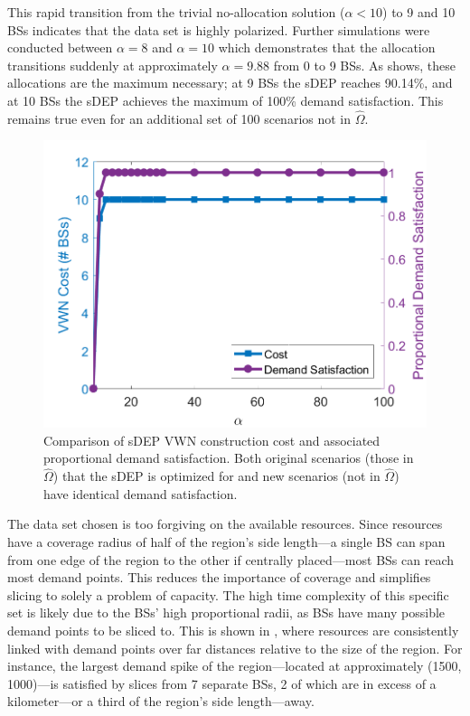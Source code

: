 \documentclass[12pt,dvipsnames]{report}
\begin{document}
This rapid transition from the trivial no-allocation solution ($\alpha < 10$) to 9 and 10 BSs indicates that the data set is highly polarized.  Further simulations were conducted between $\alpha = 8$ and $\alpha = 10$ which demonstrates that the allocation transitions suddenly at approximately $\alpha = 9.88$ from 0 to 9 BSs.  As  shows, these allocations are the maximum necessary; at 9 BSs the sDEP reaches 90.14\%, and at 10 BSs the sDEP achieves the maximum of 100\% demand satisfaction.  This remains true even for an additional set of 100 scenarios not in $\hat{\Omega}$.

\begin{figure}[htp]
	\centering
	\includegraphics[height=0.4\textheight]{Figures/CaseI_sDEPComparisonCostSat}
	\caption[Comparison of Case I sDEP approach cost and demand satisfaction]{Comparison of sDEP VWN construction cost and associated proportional demand satisfaction.  Both original scenarios (those in $\hat{\Omega}$) that the sDEP is optimized for and new scenarios (not in $\hat{\Omega}$) have identical demand satisfaction.}
	\label{fig:CaseI_sDEPComparisonCostSat}
\end{figure}

The data set chosen is too forgiving on the available resources.  Since resources have a coverage radius of half of the region's side length---a single BS can span from one edge of the region to the other if centrally placed---most BSs can reach most demand points.  This reduces the importance of coverage and simplifies slicing to solely a problem of capacity.  The high time complexity of this specific set is likely due to the BSs' high proportional radii, as BSs have many possible demand points to be sliced to.  This is shown in , where resources are consistently linked with demand points over far distances relative to the size of the region.  For instance, the largest demand spike of the region---located at approximately (1500, 1000)---is satisfied by slices from 7 separate BSs, 2 of which are in excess of a kilometer---or a third of the region's side length---away.
\end{document}
